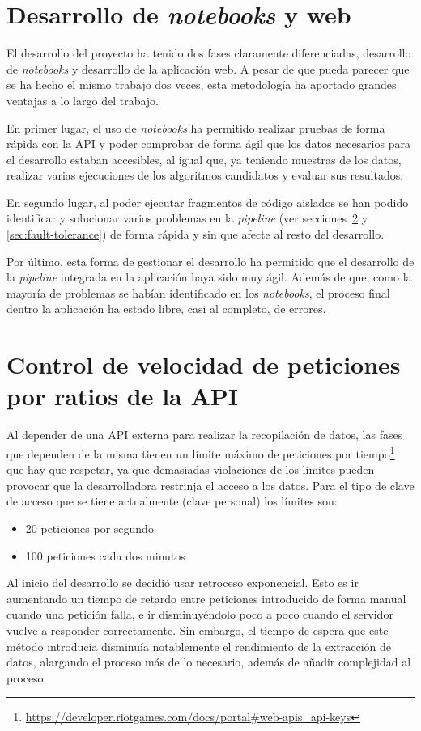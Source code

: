 \section{Desarrollo de \textit{notebooks} y web}
El desarrollo del proyecto ha tenido dos fases claramente diferenciadas, desarrollo de \textit{notebooks} y desarrollo de la aplicación web. A pesar de que pueda parecer que se ha hecho el mismo trabajo dos veces, esta metodología ha aportado grandes ventajas a lo largo del trabajo.

En primer lugar, el uso de \textit{notebooks} ha permitido realizar pruebas de forma rápida con la API y poder comprobar de forma ágil que los datos necesarios para el desarrollo estaban accesibles, al igual que, ya teniendo muestras de los datos, realizar varias ejecuciones de los algoritmos candidatos y evaluar sus resultados.

En segundo lugar, al poder ejecutar fragmentos de código aislados se han podido identificar y solucionar varios problemas en la \textit{pipeline} (ver secciones~\ref{sec:rate-limit} y \ref{sec:fault-tolerance}) de forma rápida y sin que afecte al resto del desarrollo.

Por último, esta forma de gestionar el desarrollo ha permitido que el desarrollo de la \textit{pipeline} integrada en la aplicación haya sido muy ágil. Además de que, como la mayoría de problemas se habían identificado en los \textit{notebooks}, el proceso final dentro la aplicación ha estado libre, casi al completo, de errores.

\section{Control de velocidad de peticiones por ratios de la API}\label{sec:rate-limit}
Al depender de una API externa para realizar la recopilación de datos, las fases que dependen de la misma tienen un límite máximo de peticiones por tiempo\footnote{\url{https://developer.riotgames.com/docs/portal\#web-apis_api-keys}} que hay que respetar, ya que demasiadas violaciones de los límites pueden provocar que la desarrolladora restrinja el acceso a los datos. Para el tipo de clave de acceso que se tiene actualmente (clave personal) los límites son:
\begin{itemize}
	\tightlist
	\item 20 peticiones por segundo
	\item 100 peticiones cada dos minutos
\end{itemize}
Al inicio del desarrollo se decidió usar retroceso exponencial. Esto es ir aumentando un tiempo de retardo entre peticiones introducido de forma manual cuando una petición falla, e ir disminuyéndolo poco a poco cuando el servidor vuelve a responder correctamente. Sin embargo, el tiempo de espera que este método introducía disminuía notablemente el rendimiento de la extracción de datos, alargando el proceso más de lo necesario, además de añadir complejidad al proceso.

